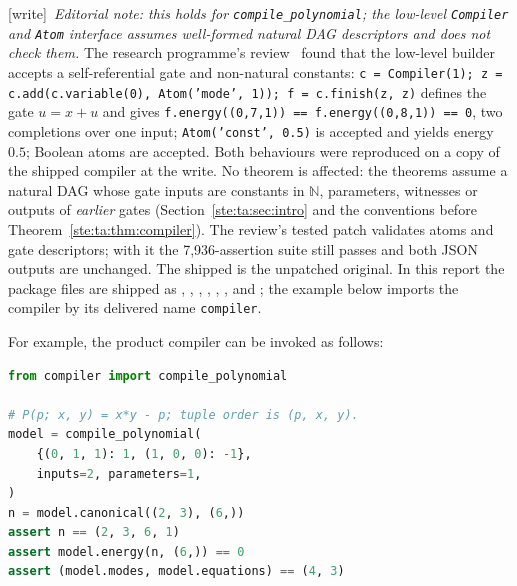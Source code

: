 \documentclass[11pt,letterpaper]{article}
\theoremstyle{definition}
\theoremstyle{remark}
\newcommand{\N}{\mathbb N}
\newcommand{\wtag}{\textup{[write]}}
\begin{document}
\wtag\ \emph{Editorial note: this holds for \texttt{compile\_polynomial}; the low-level \texttt{Compiler} and \texttt{Atom} interface assumes well-formed natural DAG descriptors and does not check them.} The research programme's review~\cite{review1977} found that the low-level builder accepts a self-referential gate and non-natural constants: \texttt{c = Compiler(1); z = c.add(c.variable(0), Atom('mode', 1)); f = c.finish(z, z)} defines the gate $u=x+u$ and gives \texttt{f.energy((0,7,1)) == f.energy((0,8,1)) == 0}, two completions over one input; \texttt{Atom('const', 0.5)} is accepted and yields energy $0.5$; Boolean atoms are accepted. Both behaviours were reproduced on a copy of the shipped compiler at the write. No theorem is affected: the theorems assume a natural DAG whose gate inputs are constants in $\N$, parameters, witnesses or outputs of \emph{earlier} gates (Section~\ref{ste:ta:sec:intro} and the conventions before Theorem~\ref{ste:ta:thm:compiler}). The review's tested patch  validates atoms and gate descriptors; with it the 7,936-assertion suite still passes and both JSON outputs are unchanged. The shipped  is the unpatched original. In this report the package files are shipped as , , , , , ,  and ; the example below imports the compiler by its delivered name \texttt{compiler}.

For example, the product compiler can be invoked as follows:
\begin{lstlisting}[language=Python]
from compiler import compile_polynomial

# P(p; x, y) = x*y - p; tuple order is (p, x, y).
model = compile_polynomial(
    {(0, 1, 1): 1, (1, 0, 0): -1},
    inputs=2, parameters=1,
)
n = model.canonical((2, 3), (6,))
assert n == (2, 3, 6, 1)
assert model.energy(n, (6,)) == 0
assert (model.modes, model.equations) == (4, 3)
\end{lstlisting}
\end{document}
